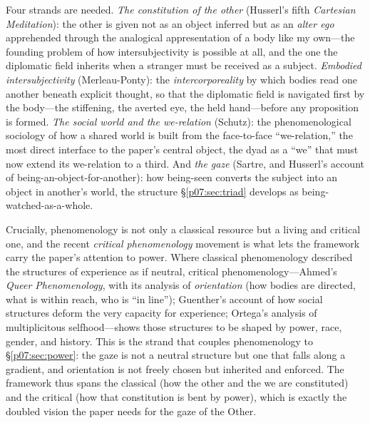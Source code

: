 Four strands are needed. \emph{The constitution of the other} (Husserl's fifth \emph{Cartesian Meditation}): the other is given not as an object inferred but as an \emph{alter ego} apprehended through the analogical appresentation of a body like my own---the founding problem of how intersubjectivity is possible at all, and the one the diplomatic field inherits when a stranger must be received as a subject. \emph{Embodied intersubjectivity} (Merleau-Ponty): the \emph{intercorporeality} by which bodies read one another beneath explicit thought, so that the diplomatic field is navigated first by the body---the stiffening, the averted eye, the held hand---before any proposition is formed. \emph{The social world and the we-relation} (Schutz): the phenomenological sociology of how a shared world is built from the face-to-face ``we-relation,'' the most direct interface to the paper's central object, the dyad as a ``we'' that must now extend its we-relation to a third. And \emph{the gaze} (Sartre, and Husserl's account of being-an-object-for-another): how being-seen converts the subject into an object in another's world, the structure §\ref{p07:sec:triad} develops as being-watched-as-a-whole.

Crucially, phenomenology is not only a classical resource but a living and critical one, and the recent \emph{critical phenomenology} movement is what lets the framework carry the paper's attention to power. Where classical phenomenology described the structures of experience as if neutral, critical phenomenology---Ahmed's \emph{Queer Phenomenology}, with its analysis of \emph{orientation} (how bodies are directed, what is within reach, who is ``in line''); Guenther's account of how social structures deform the very capacity for experience; Ortega's analysis of multiplicitous selfhood---shows those structures to be shaped by power, race, gender, and history. This is the strand that couples phenomenology to §\ref{p07:sec:power}: the gaze is not a neutral structure but one that falls along a gradient, and orientation is not freely chosen but inherited and enforced. The framework thus spans the classical (how the other and the we are constituted) and the critical (how that constitution is bent by power), which is exactly the doubled vision the paper needs for the gaze of the Other.

